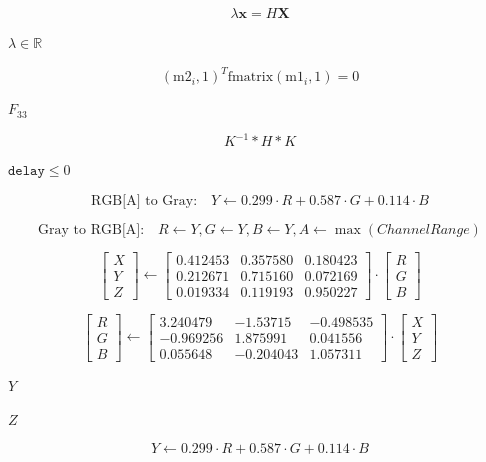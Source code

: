 \documentclass{article}
\begin{document}
\[  \lambda \mathbf{x} = H \mathbf{X}
\]
\pagebreak

$\lambda \in \mathbb{R} $
\pagebreak

\[ (\mathrm{m2}_i,1)^T \mathrm{fmatrix} (\mathrm{m1}_i,1) = 0
\]
\pagebreak

$F_{33}$
\pagebreak

\[  K^{-1} * H * K
\]
\pagebreak

$\texttt{delay}\leq 0$
\pagebreak

\[\text{RGB[A] to Gray:} \quad Y  \leftarrow 0.299  \cdot R + 0.587  \cdot G + 0.114  \cdot B\]
\pagebreak

\[\text{Gray to RGB[A]:} \quad R  \leftarrow Y, G  \leftarrow Y, B  \leftarrow Y, A  \leftarrow \max (ChannelRange)\]
\pagebreak

\[\begin{bmatrix} X  \\ Y  \\ Z
  \end{bmatrix} \leftarrow \begin{bmatrix} 0.412453 & 0.357580 & 0.180423 \\ 0.212671 & 0.715160 & 0.072169 \\ 0.019334 & 0.119193 & 0.950227
  \end{bmatrix} \cdot \begin{bmatrix} R  \\ G  \\ B
  \end{bmatrix}\]
\pagebreak

\[\begin{bmatrix} R  \\ G  \\ B
  \end{bmatrix} \leftarrow \begin{bmatrix} 3.240479 & -1.53715 & -0.498535 \\ -0.969256 &  1.875991 & 0.041556 \\ 0.055648 & -0.204043 & 1.057311
  \end{bmatrix} \cdot \begin{bmatrix} X  \\ Y  \\ Z
  \end{bmatrix}\]
\pagebreak

$Y$
\pagebreak

$Z$
\pagebreak

\[Y  \leftarrow 0.299  \cdot R + 0.587  \cdot G + 0.114  \cdot B\]
\pagebreak
\end{document}
